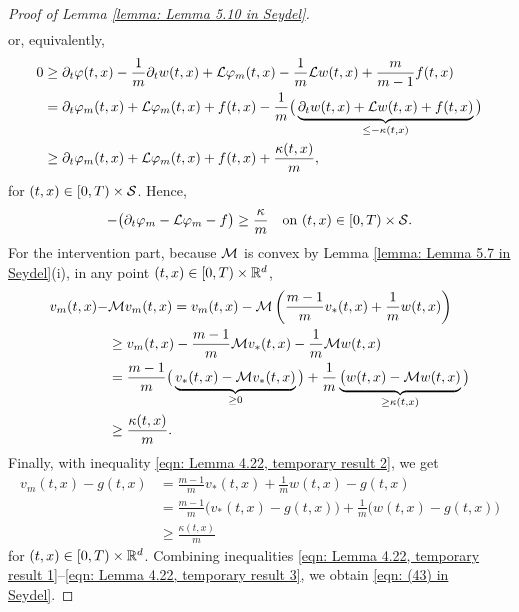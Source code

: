 \begin{proof}[Proof of Lemma \ref{lemma: Lemma 5.10 in Seydel}]
\begin{equation*}
\begin{aligned}
        \end{aligned}
    \end{equation*}
    or, equivalently,
    \begin{align*}
        0 &\geq \partial_t \varphi(t,x) - \frac 1 m \partial_t w(t,x) + \mathcal{L} \varphi_m(t,x) - \frac 1 m \mathcal{L} w(t,x) + \frac{m}{m-1} f(t,x) \\
        &= \partial_t \varphi_m(t,x) + \mathcal{L} \varphi_m(t,x) + f(t,x) - \frac{1}{m} \big( \underbrace{\partial_t w(t,x) + \mathcal{L} w(t,x) + f(t,x)}_{\leq -\kappa(t,x)} \big) \\
        &\geq \partial_t \varphi_m(t,x) + \mathcal{L} \varphi_m(t,x) + f(t,x) + \frac{\kappa(t,x)}{m},
    \end{align*}
    for $(t,x) \in [0,T)\times \mathcal{S}$. Hence, 
    \begin{equation}
        -\big( \partial_t \varphi_m - \mathcal{L} \varphi_m - f\big) \geq \frac{\kappa}{m} \quad \text{on } (t,x) \in [0,T) \times \mathcal{S}.
        \label{eqn: Lemma 4.22, temporary result 1}
    \end{equation}
    For the intervention part, because $\mathcal{M}$ is convex by Lemma \ref{lemma: Lemma 5.7 in Seydel}(i), in any point $(t,x) \in [0,T) \times \mathbb{R}^d$,
    \begin{align}
        v_m(t,x) - & \mathcal{M} v_m(t,x) = v_m(t,x) - \mathcal{M} \left( \frac{m-1}{m} v_*(t,x) + \frac 1 m w(t,x) \right) \nonumber\\
        &\geq v_m(t,x) - \frac{m-1}{m} \mathcal{M} v_*(t,x) - \frac{1}{m} \mathcal{M} w(t,x) \nonumber \\
        &= \frac{m-1}{m} \big( \underbrace{v_*(t,x) - \mathcal{M} v_*(t,x)}_{\geq 0} \big) + \frac 1 m \underbrace{\big(w(t,x) - \mathcal{M} w(t,x)}_{\geq \kappa(t,x)} \big) \nonumber \\
        &\geq \frac{\kappa(t,x)}{m}. \label{eqn: Lemma 4.22, temporary result 2}
    \end{align}
    Finally, with inequality \eqref{eqn: Lemma 4.22, temporary result 2}, we get
    \begin{align}
        v_m(t,x) - g(t,x) &= \frac{m-1}{m} v_*(t,x) + \frac{1}{m} w(t,x) - g(t,x) \nonumber \\
        &= \frac{m-1}{m} \big( v_*(t,x) - g(t,x) \big) + \frac 1 m \big( w(t,x) - g(t,x) \big) \nonumber  \\
        & \geq \frac{\kappa(t,x)}{m}
        \label{eqn: Lemma 4.22, temporary result 3}
    \end{align}
    for $(t,x) \in [0,T) \times \mathbb{R}^d$. Combining inequalities \eqref{eqn: Lemma 4.22, temporary result 1}--\eqref{eqn: Lemma 4.22, temporary result 3}, we obtain \eqref{eqn: (43) in Seydel}. 
    

\end{proof}
